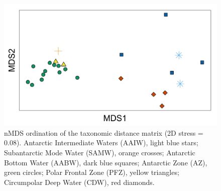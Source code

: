 \begin{figure}[!ht]
  \centering
  \includegraphics[width=\textwidth]{../advection/nMDStaxonomic.png}
  \caption[nMDS of advective distances between samples.]{nMDS ordination of the taxonomic distance matrix (2D stress = 0.08). Antarctic Intermediate Waters (AAIW), light blue stars; Subantarctic Mode Water (SAMW), orange crosses; Antarctic Bottom Water (AABW), dark blue squares; Antarctic Zone (AZ), green circles; Polar Frontal Zone (PFZ), yellow triangles; Circumpolar Deep Water (CDW), red diamonds.}
  \label{fig:nMDStaxonomic}
\end{figure}
